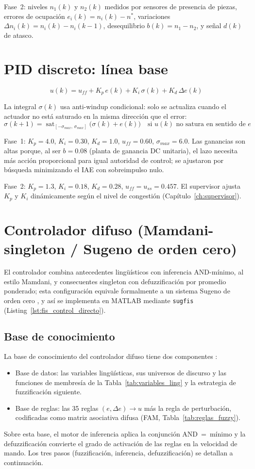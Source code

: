 Fase~2: niveles $n_1(k)$ y $n_2(k)$ medidos por sensores de presencia de piezas, errores de ocupación $e_i(k)=n_i(k)-n^*$, variaciones $\Delta n_i(k)=n_i(k)-n_i(k-1)$, desequilibrio $b(k)=n_1-n_2$, y señal $d(k)$ de atasco.

\section{PID discreto: línea base}

\[
u(k) = u_{ff} + K_p\,e(k) + K_i\,\sigma(k) + K_d\,\Delta e(k)
\]

La integral $\sigma(k)$ usa anti-windup condicional: solo se actualiza cuando el actuador no está saturado en la misma dirección que el error:
\[
\sigma(k+1) = \operatorname{sat}_{[-\sigma_{max},\,\sigma_{max}]}\!\bigl(\sigma(k) + e(k)\bigr)
\quad\text{si }u(k)\text{ no satura en sentido de }e
\]

Fase~1: $K_p=4.0$, $K_i=0.30$, $K_d=1.0$, $u_{ff}=0.60$, $\sigma_{max}=6.0$. Las ganancias son altas porque, al ser $b=0.08$ (planta de ganancia DC unitaria), el lazo necesita más acción proporcional para igual autoridad de control; se ajustaron por búsqueda minimizando el IAE con sobreimpulso nulo.

Fase~2: $K_p=1.3$, $K_i=0.18$, $K_d=0.28$, $u_{ff}=u_{ss}=0.457$. El supervisor ajusta $K_p$ y $K_i$ dinámicamente según el nivel de congestión (Capítulo~\ref{ch:supervisor}).

\section{Controlador difuso (Mamdani-singleton / Sugeno de orden cero)}

El controlador combina antecedentes lingüísticos con inferencia AND-mínimo, al estilo Mamdani, y consecuentes singleton con defuzzificación por promedio ponderado; esta configuración equivale formalmente a un sistema Sugeno de orden cero \cite[cap.~5]{passino2005biomimicry}, y así se implementa en MATLAB mediante \texttt{sugfis} (Listing~\ref{lst:fis_control_directo}).

\subsection*{Base de conocimiento}

La base de conocimiento del controlador difuso tiene dos componentes \cite[cap.~5]{passino2005biomimicry}:
\begin{itemize}
  \item Base de datos: las variables lingüísticas, sus universos de discurso y las funciones de membresía de la Tabla~\ref{tab:variables_ling} y la estrategia de fuzzificación siguiente.
  \item Base de reglas: las 35 reglas $(e,\Delta e)\!\to\!u$ más la regla de perturbación, codificadas como matriz asociativa difusa (FAM, Tabla~\ref{tab:reglas_fuzzy}).
\end{itemize}
Sobre esta base, el motor de inferencia aplica la conjunción AND~=~mínimo y la defuzzificación convierte el grado de activación de las reglas en la velocidad de mando. Los tres pasos (fuzzificación, inferencia, defuzzificación) se detallan a continuación.

